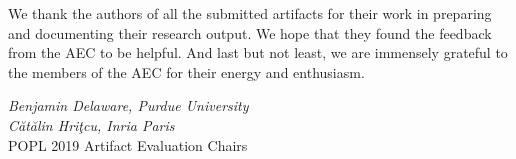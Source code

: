 We thank the authors of all the submitted artifacts for their work in
preparing and documenting their research output. We hope that they
found the feedback from the AEC to be helpful. And last but not least,
we are immensely grateful to the members of the AEC for their energy
and enthusiasm.

\begin{flushright}
\textit{Benjamin Delaware, Purdue University} \\
\textit{C\u{a}t\u{a}lin Hri\c{t}cu, Inria Paris} \\
POPL 2019 Artifact Evaluation Chairs
\end{flushright}

\newpage
